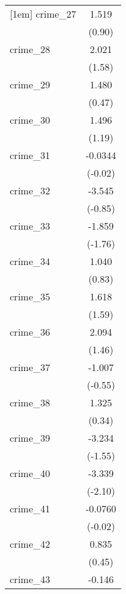 {\begin{tabular}{l*{1}{c}}
[1em]
crime\_27    &       1.519         \\
            &      (0.90)         \\
[1em]
crime\_28    &       2.021         \\
            &      (1.58)         \\
[1em]
crime\_29    &       1.480         \\
            &      (0.47)         \\
[1em]
crime\_30    &       1.496         \\
            &      (1.19)         \\
[1em]
crime\_31    &     -0.0344         \\
            &     (-0.02)         \\
[1em]
crime\_32    &      -3.545         \\
            &     (-0.85)         \\
[1em]
crime\_33    &      -1.859         \\
            &     (-1.76)         \\
[1em]
crime\_34    &       1.040         \\
            &      (0.83)         \\
[1em]
crime\_35    &       1.618         \\
            &      (1.59)         \\
[1em]
crime\_36    &       2.094         \\
            &      (1.46)         \\
[1em]
crime\_37    &      -1.007         \\
            &     (-0.55)         \\
[1em]
crime\_38    &       1.325         \\
            &      (0.34)         \\
[1em]
crime\_39    &      -3.234         \\
            &     (-1.55)         \\
[1em]
crime\_40    &      -3.339\sym{*}  \\
            &     (-2.10)         \\
[1em]
crime\_41    &     -0.0760         \\
            &     (-0.02)         \\
[1em]
crime\_42    &       0.835         \\
            &      (0.45)         \\
[1em]
crime\_43    &      -0.146         \\

\end{tabular}}
